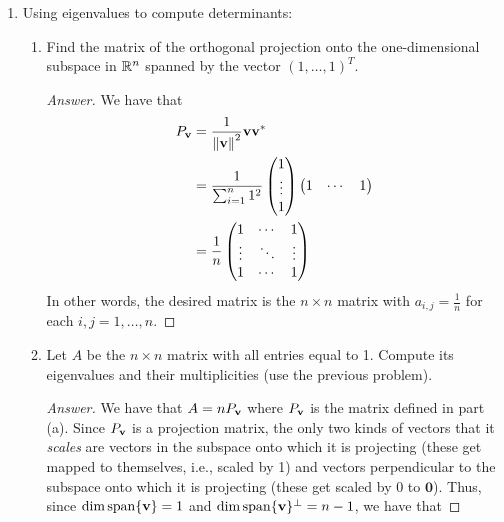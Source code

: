 \documentclass[../psets.tex]{subfiles}
\begin{document}
\begin{enumerate}[label={\textbf{3.\arabic*.}}]
\begin{proof}[Answer]
    \end{proof}
    \item Using eigenvalues to compute determinants:
    \begin{enumerate}
        \item Find the matrix of the orthogonal projection onto the one-dimensional subspace in $\mathbb{R}^n$ spanned by the vector $(1,\dots,1)^T$.
        \begin{proof}[Answer]
            We have that
            \begin{align*}
                P_{\mathbf{v}} &= \frac{1}{\norm{\mathbf{v}}^2}\mathbf{v}\mathbf{v}^*\\
                &= \frac{1}{\sum_{i=1}^n1^2}
                \begin{pmatrix}
                    1\\
                    \vdots\\
                    1\\
                \end{pmatrix}
                \begin{pmatrix}
                    1 & \cdots & 1\\
                \end{pmatrix}\\
                &= \frac{1}{n}
                \begin{pmatrix}
                    1 & \cdots & 1\\
                    \vdots & \ddots & \vdots\\
                    1 & \cdots & 1\\
                \end{pmatrix}
            \end{align*}
            In other words, the desired matrix is the $n\times n$ matrix with $a_{i,j}=\frac{1}{n}$ for each $i,j=1,\dots,n$.
        \end{proof}
        \item Let $A$ be the $n\times n$ matrix with all entries equal to 1. Compute its eigenvalues and their multiplicities (use the previous problem).
        \begin{proof}[Answer]
            We have that $A=nP_{\mathbf{v}}$ where $P_{\mathbf{v}}$ is the matrix defined in part (a). Since $P_{\mathbf{v}}$ is a projection matrix, the only two kinds of vectors that it \emph{scales} are vectors in the subspace onto which it is projecting (these get mapped to themselves, i.e., scaled by 1) and vectors perpendicular to the subspace onto which it is projecting (these get scaled by 0 to $\bm{0}$). Thus, since $\dim\operatorname{span}\{\mathbf{v}\}=1$ and $\dim\operatorname{span}\{\mathbf{v}\}^\perp=n-1$, we have that

\end{proof}
\end{enumerate}
\end{enumerate}
\end{document}
